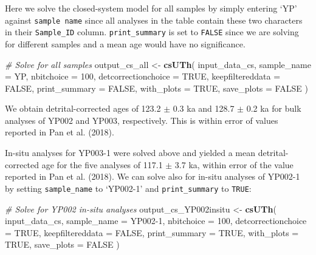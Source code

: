 \documentclass[]{elsarticle} %
\newenvironment{Shaded}{\begin{snugshade}}{\end{snugshade}}
\newcommand{\CommentTok}[1]{\textcolor[rgb]{0.56,0.35,0.01}{\textit{#1}}}
\newcommand{\DataTypeTok}[1]{\textcolor[rgb]{0.13,0.29,0.53}{#1}}
\newcommand{\DecValTok}[1]{\textcolor[rgb]{0.00,0.00,0.81}{#1}}
\newcommand{\KeywordTok}[1]{\textcolor[rgb]{0.13,0.29,0.53}{\textbf{#1}}}
\newcommand{\NormalTok}[1]{#1}
\newcommand{\OtherTok}[1]{\textcolor[rgb]{0.56,0.35,0.01}{#1}}
\newcommand{\StringTok}[1]{\textcolor[rgb]{0.31,0.60,0.02}{#1}}
\begin{document}
Here we solve the closed-system model for all samples by simply entering `YP' against \texttt{sample\ name} since all analyses in the table contain these two characters in their \texttt{Sample\_ID} column. \texttt{print\_summary} is set to \texttt{FALSE} since we are solving for different samples and a mean age would have no significance.

\begin{Shaded}
\begin{Highlighting}[]
\CommentTok{\# Solve for all samples}
\NormalTok{output\_cs\_all \textless{}{-}}
\StringTok{  }\KeywordTok{csUTh}\NormalTok{(}
\NormalTok{    input\_data\_cs,}
    \DataTypeTok{sample\_name =} \StringTok{\textquotesingle{}YP\textquotesingle{}}\NormalTok{,}
    \DataTypeTok{nbitchoice =} \DecValTok{100}\NormalTok{,}
    \DataTypeTok{detcorrectionchoice =} \OtherTok{TRUE}\NormalTok{,}
    \DataTypeTok{keepfiltereddata =} \OtherTok{FALSE}\NormalTok{,}
    \DataTypeTok{print\_summary =} \OtherTok{FALSE}\NormalTok{,}
    \DataTypeTok{with\_plots =} \OtherTok{TRUE}\NormalTok{,}
    \DataTypeTok{save\_plots =} \OtherTok{FALSE}
\NormalTok{  )}
\end{Highlighting}
\end{Shaded}

We obtain detrital-corrected ages of 123.2 \(\pm\) 0.3 ka and 128.7 \(\pm\) 0.2 ka for bulk analyses of YP002 and YP003, respectively. This is within error of values reported in Pan et al. (2018).

In-situ analyses for YP003-1 were solved above and yielded a mean detrital-corrected age for the five analyses of 117.1 \(\pm\) 3.7 ka, within error of the value reported in Pan et al. (2018).
We can solve also for in-situ analyses of YP002-1 by setting \texttt{sample\_name} to `YP002-1' and \texttt{print\_summary} to \texttt{TRUE}:

\begin{Shaded}
\begin{Highlighting}[]
\CommentTok{\# Solve for YP002 in{-}situ analyses}
\NormalTok{output\_cs\_YP002insitu \textless{}{-}}
\StringTok{  }\KeywordTok{csUTh}\NormalTok{(}
\NormalTok{    input\_data\_cs,}
    \DataTypeTok{sample\_name =} \StringTok{\textquotesingle{}YP002{-}1\textquotesingle{}}\NormalTok{,}
    \DataTypeTok{nbitchoice =} \DecValTok{100}\NormalTok{,}
    \DataTypeTok{detcorrectionchoice =} \OtherTok{TRUE}\NormalTok{,}
    \DataTypeTok{keepfiltereddata =} \OtherTok{FALSE}\NormalTok{,}
    \DataTypeTok{print\_summary =} \OtherTok{TRUE}\NormalTok{,}
    \DataTypeTok{with\_plots =} \OtherTok{TRUE}\NormalTok{,}
    \DataTypeTok{save\_plots =} \OtherTok{FALSE}
\NormalTok{  )}
\end{Highlighting}
\end{Shaded}
\end{document}
